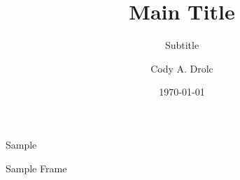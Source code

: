 \documentclass[12pt]{beamer}
\title[]{Main Title}
\subtitle{Subtitle}
\author[Drolc]{Cody A. Drolc} %
\institute[]{University of Missouri} %
\date{\today} %
\begin{document}

\frame{\titlepage} %

\begin{frame}{Sample}
  \begin{center}
    Sample Frame
  \end{center}
\end{frame}
 
\end{document}
